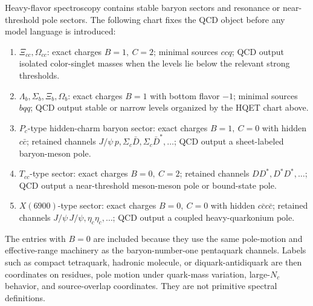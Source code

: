 \begin{definition}
\label{def:qcd-near-threshold-heavy-spectroscopy-chart}
Heavy-flavor spectroscopy contains stable baryon sectors and resonance or
near-threshold pole sectors.  The following chart fixes the QCD object before
any model language is introduced:
\begin{enumerate}[label=(\alph*)]
\item \(\Xi_{cc},\Omega_{cc}\): exact charges \(B=1,\ C=2\); minimal
  sources \(ccq\); QCD output isolated color-singlet masses when the levels
  lie below the relevant strong thresholds.
\item \(\Lambda_b,\Sigma_b,\Xi_b,\Omega_b\): exact charges \(B=1\) with
  bottom flavor \(-1\); minimal sources \(bqq\); QCD output stable or narrow
  levels organized by the HQET chart above.
\item \(P_c\)-type hidden-charm baryon sector: exact charges \(B=1,\ C=0\)
  with hidden \(c\bar c\); retained channels
  \(J/\psi\,p,\Sigma_c\bar D,\Sigma_c\bar D^\ast,\ldots\); QCD output a
  sheet-labeled baryon-meson pole.
\item \(T_{cc}\)-type sector: exact charges \(B=0,\ C=2\); retained channels
  \(DD^\ast,D^\ast D^\ast,\ldots\); QCD output a near-threshold meson-meson
  pole or bound-state pole.
\item \(X(6900)\)-type sector: exact charges \(B=0,\ C=0\) with hidden
  \(c\bar c c\bar c\); retained channels
  \(J/\psi\,J/\psi,\eta_c\eta_c,\ldots\); QCD output a coupled
  heavy-quarkonium pole.
\end{enumerate}
The entries with \(B=0\) are included because they use the same pole-motion
and effective-range machinery as the baryon-number-one pentaquark channels.
Labels such as compact tetraquark, hadronic molecule, or diquark-antidiquark
are then coordinates on residues, pole motion under quark-mass variation,
large-\(N_c\) behavior, and source-overlap coordinates.  They are not primitive
spectral definitions.
\end{definition}

